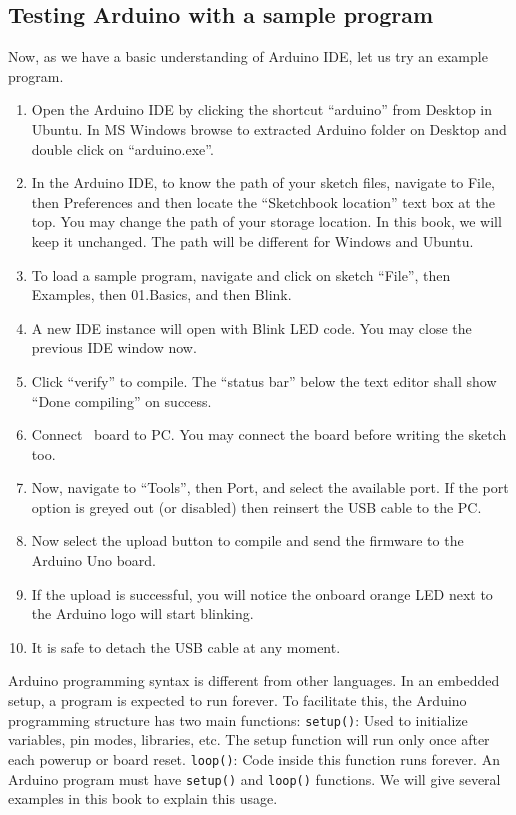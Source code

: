 \subsection{Testing Arduino with a sample program}
\label{sec:testing-arduino}
Now, as we have a basic understanding of Arduino IDE, let us try an
example program.
\begin{enumerate}
      \item Open the Arduino IDE by clicking the shortcut ``arduino'' from
            Desktop in Ubuntu. In MS Windows browse to extracted Arduino folder
            on Desktop and double click on ``arduino.exe''.
      \item In the Arduino IDE, to know the path of your sketch files,
            navigate to File, then Preferences and then locate the ``Sketchbook
            location'' text box at the top.  You may change the path of your
            storage location. In this book, we will keep it unchanged. The path
            will be different for Windows and Ubuntu.
      \item To load a sample program, navigate and click on sketch ``File'',
            then Examples, then 01.Basics, and then Blink.
      \item A new IDE instance will open with Blink LED code.  You may close
            the previous IDE window now.
      \item Click ``verify'' to compile. The ``status bar'' below the text editor
            shall show ``Done compiling'' on success.
      \item Connect \arduino\ board to PC. You may connect the board
            before writing the sketch too.
      \item Now, navigate to ``Tools'', then Port, and select the available
            port. If the port option is greyed out (or disabled) then reinsert the
            USB cable to the PC.
      \item Now select the upload button to compile and send the firmware to
            the Arduino Uno board.
      \item If the upload is successful, you will notice the onboard orange LED
            next to the Arduino logo will start blinking.
      \item It is safe to detach the USB cable at any moment.
\end{enumerate}

Arduino programming syntax is different from other languages. In an
embedded setup, a program is expected to run forever. To facilitate
this, the Arduino programming structure has two main functions: {\tt setup()}:
Used to initialize variables, pin modes, libraries, etc. The setup
function will run only once after each powerup or board reset.
{\tt loop()}: Code inside this function runs forever. An Arduino program
must have {\tt setup()} and {\tt loop()} functions.  We will give several examples
in this book to explain this usage.

